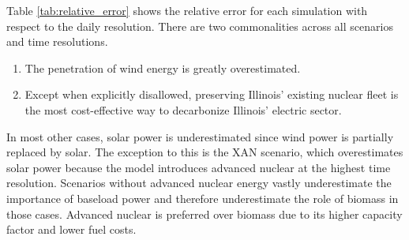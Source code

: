 Table \ref{tab:relative_error} shows the relative error for each simulation with
respect to the daily resolution. There are two commonalities across all scenarios
and time resolutions.
\begin{enumerate}
  \item The penetration of wind energy is greatly overestimated.
  \item Except when explicitly disallowed, preserving Illinois' existing nuclear
  fleet is the most cost-effective way to decarbonize Illinois' electric sector.
\end{enumerate}
In most other cases, solar power is underestimated since wind power is partially
replaced by solar. The exception to this is the XAN scenario, which overestimates
solar power because the model introduces advanced nuclear at the highest time resolution.
Scenarios without advanced nuclear energy vastly underestimate the importance of
baseload power and therefore underestimate the role of biomass in those cases.
Advanced nuclear is preferred over biomass due to its higher capacity factor and lower
fuel costs.

\begin{table}[H]
  \centering
  \caption{Relative Error in Total Capacity}
  \label{tab:relative_error}
\end{table}

